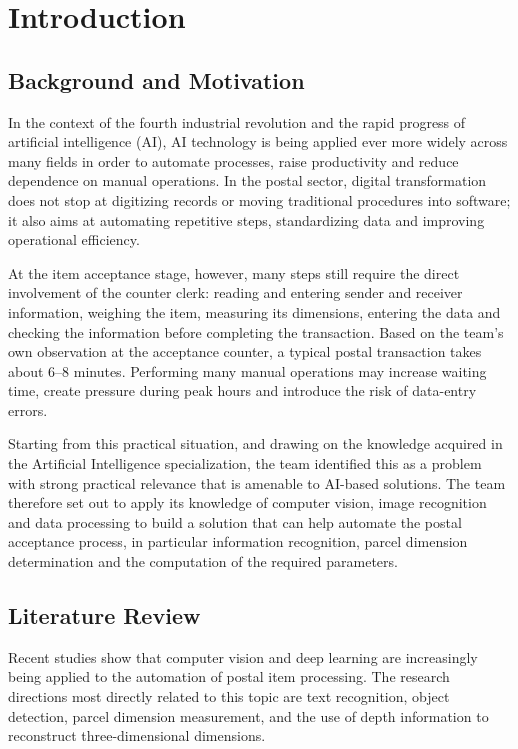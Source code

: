 \chapter{Introduction}
\label{chap:introduction}

\section{Background and Motivation}
\label{sec:background_motivation}

In the context of the fourth industrial revolution and the rapid progress of artificial intelligence (AI), AI technology is being applied ever more widely across many fields in order to automate processes, raise productivity and reduce dependence on manual operations. In the postal sector, digital transformation does not stop at digitizing records or moving traditional procedures into software; it also aims at automating repetitive steps, standardizing data and improving operational efficiency.

At the item acceptance stage, however, many steps still require the direct involvement of the counter clerk: reading and entering sender and receiver information, weighing the item, measuring its dimensions, entering the data and checking the information before completing the transaction. Based on the team's own observation at the acceptance counter, a typical postal transaction takes about 6--8 minutes. Performing many manual operations may increase waiting time, create pressure during peak hours and introduce the risk of data-entry errors.

Starting from this practical situation, and drawing on the knowledge acquired in the Artificial Intelligence specialization, the team identified this as a problem with strong practical relevance that is amenable to AI-based solutions. The team therefore set out to apply its knowledge of computer vision, image recognition and data processing to build a solution that can help automate the postal acceptance process, in particular information recognition, parcel dimension determination and the computation of the required parameters.

\section{Literature Review}

Recent studies show that computer vision and deep learning are increasingly being applied to the automation of postal item processing. The research directions most directly related to this topic are text recognition, object detection, parcel dimension measurement, and the use of depth information to reconstruct three-dimensional dimensions.

